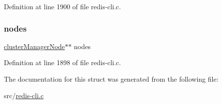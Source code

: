 Definition at line 1900 of file redis-\/cli.\+c.

\mbox{\label{structcluster_manager_node_array_ac096916b9ab293648d96462d59ae6d7d}} 
\subsubsection{\texorpdfstring{nodes}{nodes}}
{\footnotesize\ttfamily \hyperlink{structcluster_manager_node}{cluster\+Manager\+Node}$\ast$$\ast$ nodes}



Definition at line 1898 of file redis-\/cli.\+c.



The documentation for this struct was generated from the following file\+:\begin{DoxyCompactItemize}
\item 
src/\hyperlink{redis-cli_8c}{redis-\/cli.\+c}\end{DoxyCompactItemize}
